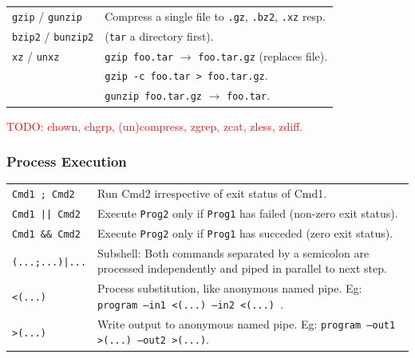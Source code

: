 \begin{tabularx}{\linewidth}{lX}
    \hline

    \texttt{gzip} / \texttt{gunzip}         &    Compress a single file to \texttt{.gz}, \texttt{.bz2}, \texttt{.xz} resp. \\
    \texttt{bzip2} / \texttt{bunzip2}       &    (\texttt{tar} a directory first). \\
    \texttt{xz} / \texttt{unxz}             & \texttt{gzip foo.tar} $\to$ \texttt{foo.tar.gz} (replaces file).\\
                                            & \texttt{gzip -c foo.tar > foo.tar.gz}.\\
                                            & \texttt{gunzip foo.tar.gz} $\to$ \texttt{foo.tar}.\\
    \hline


\end{tabularx}
    
\textcolor{red}{TODO: chown, chgrp, (un)compress, zgrep, zcat, zless, zdiff.}\\

\subsubsection{Process Execution}

\begin{tabularx}{\linewidth}{lX}

    \texttt{Cmd1 ; Cmd2}        & Run Cmd2 irrespective of exit status of Cmd1.\\
    \texttt{Cmd1 || Cmd2}       & Execute \texttt{Prog2} only if \texttt{Prog1} has failed (non-zero exit status).\\
    \texttt{Cmd1 \&\& Cmd2}     & Execute \texttt{Prog2} only if \texttt{Prog1} has succeded (zero exit status).\\
    \texttt{(...;...)|...}      & Subshell: Both commands separated by a semicolon are processed independently and piped in parallel to next step. \\
    \texttt{<(...)}             & Process substitution, like anonymous named pipe. Eg: \texttt{program --in1 <(...) --in2 <(...) }.\\
    \texttt{>(...)}             & Write output to anonymous named pipe. Eg: \texttt{program --out1 >(...) --out2 >(...)}.\\
    \hline

\end{tabularx}


